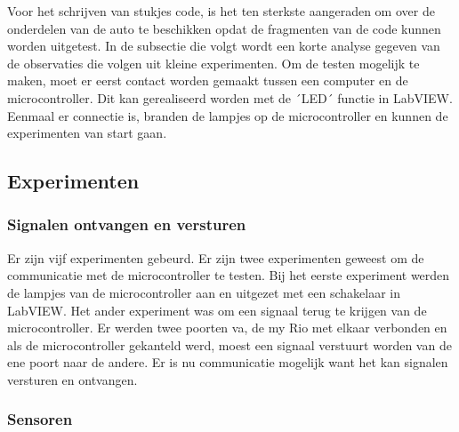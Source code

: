 \documentclass[a4paper,twoside,kulak]{kulakreport} %
\begin{document}
Voor het schrijven van stukjes code, is het ten sterkste aangeraden om over de onderdelen van de auto te beschikken opdat de fragmenten van de code kunnen worden uitgetest. In de subsectie die volgt wordt een korte analyse gegeven van de observaties die volgen uit kleine experimenten. Om de testen mogelijk te maken, moet er eerst contact worden gemaakt tussen een computer en de microcontroller. Dit kan gerealiseerd worden met de ´LED´ functie in LabVIEW. Eenmaal er connectie is, branden de lampjes op de microcontroller en kunnen de experimenten van start gaan.


\subsection{Experimenten}
\subsubsection{Signalen ontvangen en versturen}
Er zijn vijf experimenten gebeurd. Er zijn twee experimenten geweest om de communicatie met de microcontroller te testen. 
Bij het eerste experiment werden de lampjes van de microcontroller aan en uitgezet met een schakelaar in LabVIEW.
Het ander experiment was om een signaal terug te krijgen van de microcontroller.
Er werden twee poorten va, de my Rio met elkaar verbonden en als de microcontroller gekanteld werd, moest een signaal verstuurt worden van de ene poort naar de andere.
Er is nu communicatie mogelijk want het kan signalen versturen en ontvangen.




\subsubsection{Sensoren}
\end{document}
